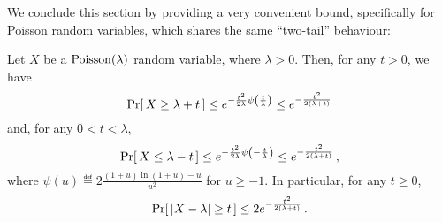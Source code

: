 We conclude this section by providing a very convenient bound, specifically for Poisson random variables, which shares the same ``two-tail'' behaviour:
\begin{theorem}\label{theo:main:poisson:bounds}
Let $X$ be a $\poisson{\lambda}$ random variable, where $\lambda > 0$. Then, for any $t>0$, we have
\begin{equation}\label{eq:poisson:upper:tail}
    \probaOf{ X \geq \lambda + t} \leq e^{-\frac{t^2}{2\lambda}\psi\Paren{\frac{t}{\lambda}}} \leq e^{-\frac{t^2}{2(\lambda+t)}}
\end{equation}
and, for any $0<t< \lambda$,
\begin{equation}\label{eq:poisson:lower:tail}
  \probaOf{ X \leq \lambda - t} \leq e^{-\frac{t^2}{2\lambda}\psi\Paren{-\frac{t}{\lambda}}} \leq e^{-\frac{t^2}{2(\lambda+t)}}\,,
\end{equation}
where $\psi(u)\eqdef 2\frac{(1+u)\ln(1+u)-u}{u^2}$ for $u\geq -1$.
In particular, for any $t\geq 0$,
\begin{equation}\label{eq:poisson:both:tail}
  \probaOf{ \abs{X -\lambda} \geq t} \leq 2e^{-\frac{t^2}{2(\lambda+t)}}\,.
\end{equation}
\end{theorem}
